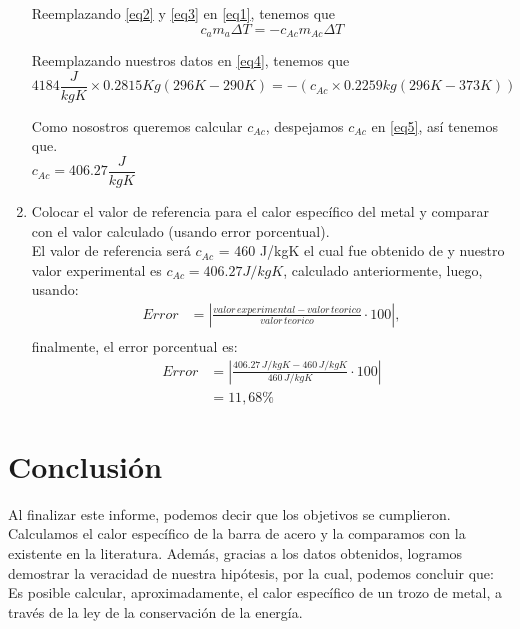 \documentclass[a4paper, 12p]{article}
\begin{document}
\begin{enumerate}
                    Reemplazando \ref{eq2} y \ref{eq3} en \ref{eq1}, tenemos que 
                    \begin{equation}\label{eq4}
                    c_{a} m_{a} \Delta T = -c_{Ac} m_{Ac} \Delta T
                    \end{equation}
                    
                    Reemplazando nuestros datos en \ref{eq4}, tenemos que 
                    \begin{equation}\label{eq5}
                    4184 \dfrac{J}{kgK} \times 0.2815Kg(296K - 290K) = -(c_{Ac} \times 0.2259kg(296K - 373K))
                    \end{equation}
                    
                    Como nosostros queremos calcular $c_{Ac}$, despejamos $c_{Ac}$ en \ref{eq5}, así tenemos que.\\
                    $c_{Ac} = 406.27 \dfrac{J}{kgK}$  		    
                      
      \item Colocar el valor de referencia para el calor específico del metal y comparar con el valor calculado (usando error porcentual).\\
      El valor de referencia será $c_{Ac}$ = 460 J/kgK el cual fue obtenido de \cite{acero} y nuestro valor experimental es  $c_{Ac} = 406.27 J/kgK$, calculado anteriormente,
      luego, usando: \\
      \begin{align*}
            Error &= \left|\frac{valor \, experimental - valor \, teorico}{valor \, teorico} \cdot 100 \right|, \\
      \end{align*}
      finalmente, el error porcentual es:
      \begin{align*}
            Error &= \left|\frac{406.27 \, J/kgK - 460 \, J/kgK }{460 \, J/kgK} \cdot 100 \right| \\
                  &= 11,68\%
      \end{align*}
      
      
    \end{enumerate}   


\section{Conclusión}
Al finalizar este informe, podemos decir que los objetivos se cumplieron. Calculamos el calor específico de la barra de acero y la comparamos con la existente en la literatura.
Además, gracias a los datos obtenidos, logramos demostrar la veracidad de nuestra hipótesis, por la cual, podemos concluir que: \\
Es posible calcular, aproximadamente, el calor específico de un trozo de metal, a través de la ley de la conservación de la energía.
\end{document}

